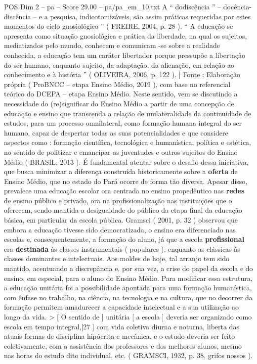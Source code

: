 \begin{textsample}{POS Dim 2 – pa – Score 29.00 – pa/pa\_em\_10.txt}
A “ dodiscência ” – docência-discência – e a pesquisa, indicotomizáveis, são assim práticas requeridas por estes momentos do ciclo gnosiológico ” ( FREIRE, 2004, p. 28 ). “ A educação se apresenta como situação gnosiológica e prática da liberdade, na qual os sujeitos, mediatizados pelo mundo, conhecem e comunicam -se sobre a realidade conhecida, a educação tem um caráter libertador porque pressupõe a libertação do ser humano, enquanto sujeito, da adaptação, da alienação, em relação ao conhecimento e à história ” ( OLIVEIRA, 2006, p. 122 ). | Fonte : Elaboração própria ( ProBNCC – etapa Ensino Médio, 2019 ), com base no referencial teórico do DCEPA – etapa Ensino Médio.
Neste sentido, vem se discutindo a necessidade do (re)significar do Ensino Médio a partir de uma concepção de educação e ensino que transcenda a relação de unilateralidade da continuidade de estudos, para um processo omnilateral, como formação humana integral do ser humano, capaz de despertar todas as suas potencialidades e que considere aspectos como : formação científica, tecnológica e humanística, política e estética, no sentido de politizar e emancipar as juventudes e outros sujeitos do Ensino Médio ( BRASIL, 2013 ).
É fundamental atentar sobre o desafio dessa iniciativa, que busca minimizar a diferença construída historicamente sobre a \textbf{oferta} de Ensino Médio, que no estado do Pará ocorre de forma tão diversa.
Apesar disso, prevalece uma educação escolar ora centrada no ensino propedêutico nas \textbf{redes} de ensino público e privado, ora na profissionalização nas instituições que o oferecem, sendo mantida a desigualdade do público da etapa final da educação básica, em particular da escola pública.
Gramsci ( 2001, p. 32 ) observou que embora a educação tivesse sido democratizada, o ensino era diferenciado nas escolas e, consequentemente, a formação do aluno, já que a escola \textbf{profissional} era \textbf{destinada} às classes instrumentais ( populares ), enquanto as clássicas às classes dominantes e intelectuais.
Aos moldes de hoje, tal arranjo tem sido mantido, acentuando a discrepância e, por sua vez, a crise do papel da escola e do ensino, em especial, para o aluno do Ensino Médio.
Para modificar essa estrutura, a educação unitária foi a possibilidade apontada para uma formação humanística, com ênfase no trabalho, na ciência, na tecnologia e na cultura, que no decorrer da formação permitem amadurecer a capacidade intelectual e a sua utilização ao longo da vida. > [ O sentido de ] unitária [ a escola ] deveria ser organizado como escola em tempo integral,[27 ] com vida coletiva diurna e noturna, liberta das atuais formas de disciplina hipócrita e mecânica, e o estudo deveria ser feito coletivamente, com a assistência dos professores e dos melhores alunos, mesmo nas horas do estudo dito individual, etc. ( GRAMSCI, 1932, p. 38, grifos nossos ).

\end{textsample}
